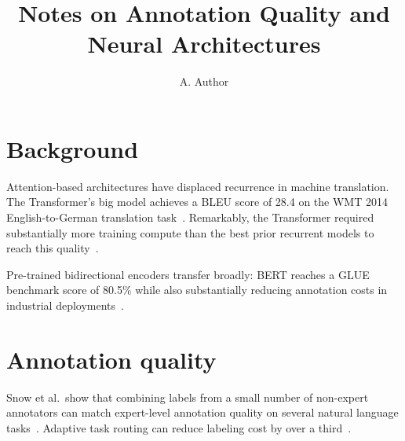 \documentclass{article}
\title{Notes on Annotation Quality and Neural Architectures}
\author{A. Author}
\begin{document}
\maketitle

\section{Background}

Attention-based architectures have displaced recurrence in machine
translation. The Transformer's big model achieves a BLEU score of 28.4 on
the WMT 2014 English-to-German translation task~\citep{vaswani2017}.
Remarkably, the Transformer required substantially more training compute
than the best prior recurrent models to reach this quality~\citep{vaswani2017}.

Pre-trained bidirectional encoders transfer broadly: BERT reaches a GLUE
benchmark score of 80.5\% while also substantially reducing annotation
costs in industrial deployments~\citep{devlin2019}.

\section{Annotation quality}

Snow et al.\ show that combining labels from a small number of non-expert
annotators can match expert-level annotation quality on several natural
language tasks~\citep{snow2008}. Adaptive task routing can reduce labeling
cost by over a third~\citep{kellner2021}.



\end{document}
